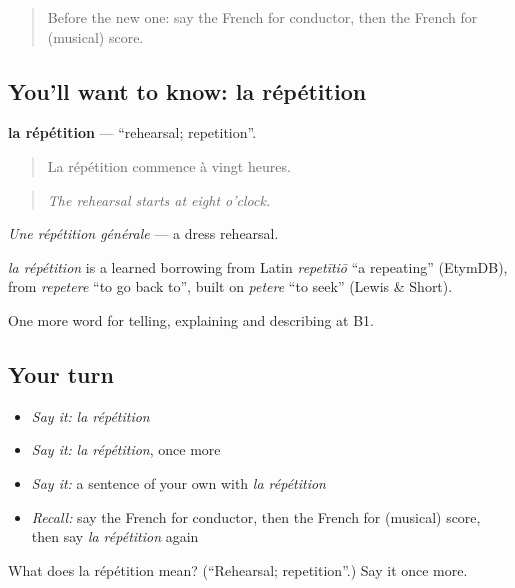 \begin{quote}
Before the new one: say the French for conductor, then the French for (musical) score.
\end{quote}

\subsection*{You'll want to know: la répétition}
\textbf{la répétition} — \textquotedblleft{}rehearsal; repetition\textquotedblright{}.

\begin{quote}
La répétition commence à vingt heures.
\end{quote}

\begin{quote}
\emph{The rehearsal starts at eight o'clock.}
\end{quote}

\emph{Une répétition générale} — a dress rehearsal.

\begin{cousinweb}
\emph{la répétition} is a learned borrowing from Latin \emph{repetītiō} \textquotedblleft{}a repeating\textquotedblright{} (EtymDB), from \emph{repetere} \textquotedblleft{}to go back to\textquotedblright{}, built on \emph{petere} \textquotedblleft{}to seek\textquotedblright{} (Lewis \& Short).
\end{cousinweb}

\begin{grammarlens}[title={What you've built}]
One more word for telling, explaining and describing at B1.
\end{grammarlens}

\subsection*{Your turn}
\begin{itemize}
\raggedright
  \item \emph{Say it:} \emph{la répétition}
  \item \emph{Say it:} \emph{la répétition}, once more
  \item \emph{Say it:} a sentence of your own with \emph{la répétition}
  \item \emph{Recall:} say the French for conductor, then the French for (musical) score, then say \emph{la répétition} again
\end{itemize}

\begin{tcolorbox}[breakable,colback=teal!4,colframe=teal!35!black,title={Before you move on}]
What does la répétition mean? (\textquotedblleft{}Rehearsal; repetition\textquotedblright{}.) Say it once more.
\end{tcolorbox}
